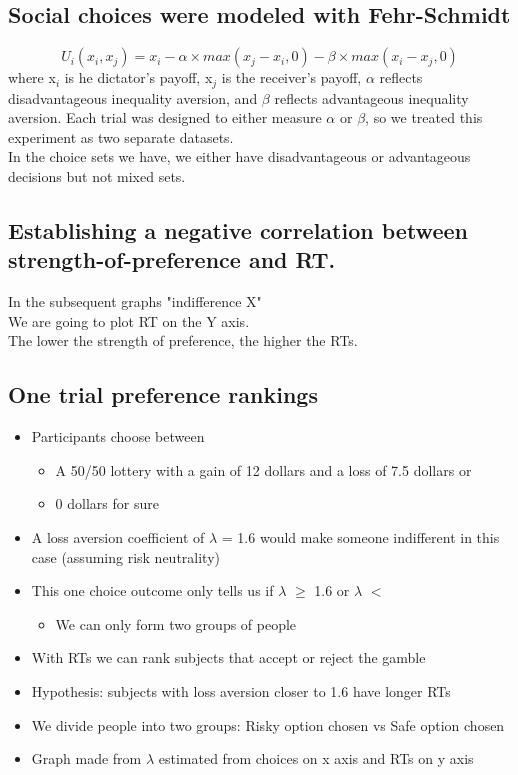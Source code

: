 \subsection{Social choices were modeled with Fehr-Schmidt}
\[U_{i}(x_{i}, x_{j}) = x_{i} -\alpha \times max(x_{j} - x_{i}, 0) - \beta \times max (x_{i} - x_{j}, 0)\]
where x$_{i}$ is he dictator's payoff, x$_{j}$ is the receiver's payoff, $\alpha$ reflects disadvantageous inequality aversion, and $\beta$ reflects advantageous inequality aversion. Each trial was designed to either measure $\alpha$ or $\beta$, so we treated this experiment as two separate datasets. 
\\In the choice sets we have, we either have disadvantageous or advantageous decisions but not mixed sets.
\subsection{Establishing a negative correlation between strength-of-preference and RT.}
In the subsequent graphs "indifference X"
\\We are going to plot RT on the Y axis.
\\The lower the strength of preference, the higher the RTs.
\subsection{One trial preference rankings}
\begin{itemize}
    \item Participants choose between
    \begin{itemize}
        \item A 50/50 lottery with a gain of 12 dollars and a loss of 7.5 dollars or
        \item 0 dollars for sure
    \end{itemize}
    \item A loss aversion coefficient of $\lambda$ = 1.6 would make someone indifferent in this case (assuming risk neutrality)
    \item This one choice outcome only tells us if $\lambda$ $\geq$ 1.6 or $\lambda$ $<$ 
    \begin{itemize}
        \item We can only form two groups of people
    \end{itemize}
    \item With RTs we can rank subjects that accept or reject the gamble
    \item Hypothesis: subjects with loss aversion closer to 1.6 have longer RTs
    \item We divide people into two groups: Risky option chosen vs Safe option chosen
    \item Graph made from $\lambda$ estimated from choices on x axis and RTs on y axis
\end{itemize}
